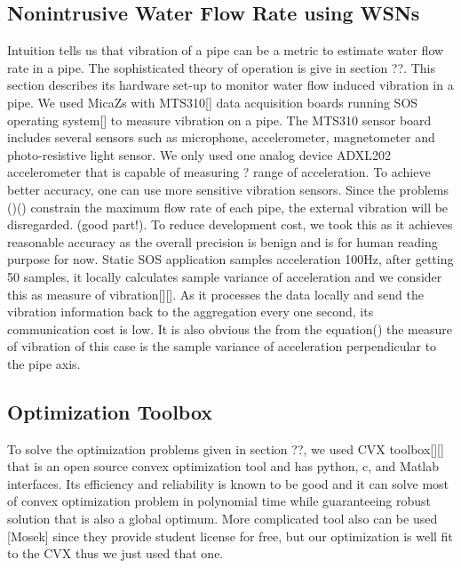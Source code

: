 \subsection{ Nonintrusive Water Flow Rate using WSNs}

Intuition tells us that vibration of a pipe can be a metric to estimate water flow rate in a pipe. The sophisticated theory of operation is give in section ??. This section describes its hardware set-up to monitor water flow induced vibration in a pipe. 
We used MicaZs with MTS310[] data acquisition boards running SOS operating system[] to measure vibration on a pipe. The MTS310 sensor board includes several sensors such as microphone, accelerometer, magnetometer and photo-resistive light sensor. We only used one analog device ADXL202 accelerometer that is capable of measuring ? range of acceleration. To achieve better accuracy, one can use more sensitive vibration sensors. Since the problems ()() constrain the maximum flow rate of each pipe, the external vibration will be disregarded. (good part!). To reduce development cost, we took this as it achieves reasonable accuracy as the overall precision is benign and is for human reading purpose for now. 
Static SOS application samples acceleration 100Hz, after getting 50 samples, it locally calculates sample variance of acceleration and we consider this as measure of vibration[][]. As it processes the data locally and send the vibration information back to the aggregation every one second, its communication cost is low. It is also obvious the from the equation() the measure of vibration of this case is the sample variance of acceleration perpendicular to the pipe axis.

\subsection{Optimization Toolbox}
To solve the optimization problems given in section ??, we used CVX toolbox[][] that is an open source convex optimization tool and has python, c, and Matlab interfaces. Its efficiency and reliability is known to be good and it can solve most of convex optimization problem in polynomial time while guaranteeing robust solution that is also a global optimum. More complicated tool also can be used [Mosek] since they provide student license for free, but our optimization is well fit to the CVX thus we just used that one. 

